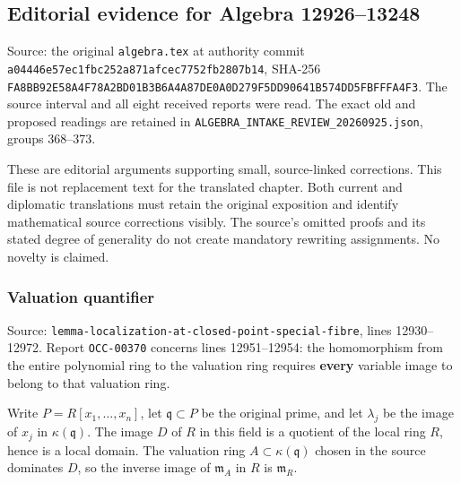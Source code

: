 \subsection{Editorial evidence for Algebra 12926--13248}\label{algebra-proof-001-editorial-evidence-for-algebra-1292613248}

Source: the original \texttt{algebra.tex} at authority commit \texttt{a044\allowbreak{}46e5\allowbreak{}7ec1\allowbreak{}fbc2\allowbreak{}52a8\allowbreak{}71af\allowbreak{}cec7\allowbreak{}752f\allowbreak{}b280\allowbreak{}7b14}, SHA-256 \texttt{FA8B\allowbreak{}B92E\allowbreak{}58A4\allowbreak{}F78A\allowbreak{}2BD0\allowbreak{}1B3B\allowbreak{}6A4A\allowbreak{}87DE\allowbreak{}0A0D\allowbreak{}279F\allowbreak{}5DD9\allowbreak{}0641\allowbreak{}B574\allowbreak{}DD5F\allowbreak{}BFFF\allowbreak{}A4F3}. The source interval and all eight received reports were read. The exact old and proposed readings are retained in \texttt{ALGEBRA\_\allowbreak{}INTAKE\_\allowbreak{}REVIEW\_\allowbreak{}20260925.\allowbreak{}json}, groups 368--373.

These are editorial arguments supporting small, source-linked corrections. This file is not replacement text for the translated chapter. Both current and diplomatic translations must retain the original exposition and identify mathematical source corrections visibly. The source's omitted proofs and its stated degree of generality do not create mandatory rewriting assignments. No novelty is claimed.

\subsubsection{Valuation quantifier}\label{algebra-proof-001-valuation-quantifier}

Source: \texttt{lemma-\AlgebraIdentifierBreak{}localization\AlgebraIdentifierBreak{}-\AlgebraIdentifierBreak{}at-\AlgebraIdentifierBreak{}closed-\AlgebraIdentifierBreak{}point-\AlgebraIdentifierBreak{}special-\AlgebraIdentifierBreak{}fibre}, lines 12930--12972. Report \texttt{OCC-00370} concerns lines 12951--12954: the homomorphism from the entire polynomial ring to the valuation ring requires \textbf{every} variable image to belong to that valuation ring.

Write \(P=R[x_1,\ldots,x_n]\), let \(\mathfrak q\subset P\) be the original prime, and let \(\lambda_j\) be the image of \(x_j\) in \(\kappa(\mathfrak q)\). The image \(D\) of \(R\) in this field is a quotient of the local ring \(R\), hence is a local domain. The valuation ring \(A\subset\kappa(\mathfrak q)\) chosen in the source dominates \(D\), so the inverse image of \(\mathfrak m_A\) in \(R\) is \(\mathfrak m_R\).

